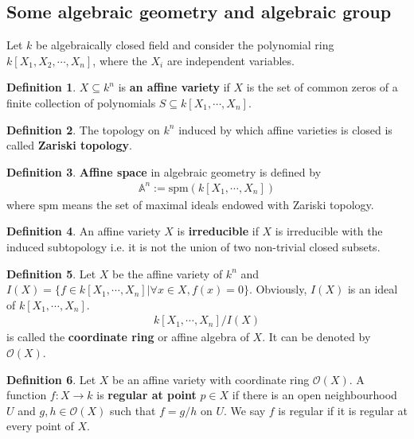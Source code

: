 \documentclass[10pt,UTF8]{article}
\theoremstyle{definition}
\newtheorem{definition}{Definition}[section]
\begin{document}
\subsection{Some algebraic geometry and algebraic group}

Let $k$ be algebraically closed field and consider the polynomial ring $k[X_1,X_2,\cdots,X_n]$, where the $X_i$ are independent variables. 



\begin{definition}
  $X\subseteq k^n$ is \textbf{an affine variety} if $X$ is the set of common zeros of a finite collection of polynomials $S\subseteq k[X_1,\cdots,X_n]$.
\end{definition}

\begin{definition}
  The topology on $k^n$ induced by which affine varieties is closed is called \textbf{Zariski topology}.
\end{definition}


\begin{definition}
  \textbf{Affine space} in algebraic geometry is defined by 
  \begin{align*}
    \mathbb{A}^n := \text{spm}(k[X_1,\cdots,X_n]) 
  \end{align*}
  where $\text{spm}$ means the set of maximal ideals endowed with Zariski topology.
\end{definition}


\begin{definition}
  An affine variety $X$ is \textbf{irreducible} if $X$ is irreducible with the induced subtopology i.e. it is not the union of two non-trivial closed subsets.
\end{definition}

\begin{definition}
  Let $X$ be the affine variety of $k^n$ and $I(X)=\{f\in k[X_1,\cdots,X_n]|\forall x\in X,f(x)=0\}$. Obviously, $I(X)$ is an ideal of $k[X_1,\cdots,X_n]$. 
  \begin{align*}
    k[X_1,\cdots,X_n]/ I(X)
  \end{align*}
  is called the \textbf{coordinate ring} or affine algebra of $X$. It can be denoted by $\mathcal{O}(X)$.
\end{definition}

\begin{definition}
  Let $X$ be an affine variety with coordinate ring $\mathcal{O}(X)$. A function $f:X\to k$ is \textbf{regular at point} $p\in X$ if there is an open neighbourhood $U$ and $g,h \in\mathcal{O}(X)$ such that $f=g/h$ on $U$.
  We say $f$ is regular if it is regular at every point of $X$.
\end{definition}
\end{document}
